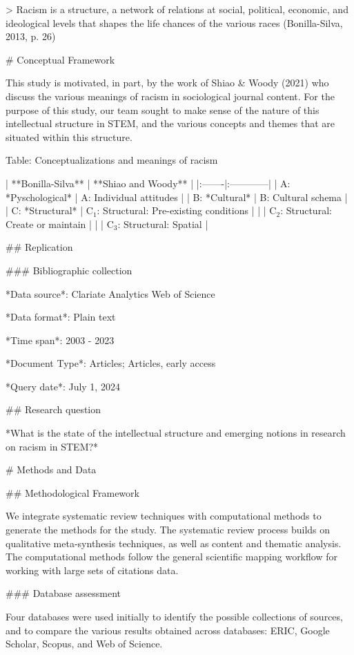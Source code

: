 {{> Racism is a structure, a network of relations at social, political, economic, and ideological levels that shapes the life chances of the various races (Bonilla-Silva, 2013, p. 26)

# Conceptual Framework

This study is motivated, in part, by the work of Shiao & Woody (2021) who discuss the various meanings of racism in sociological journal content.
For the purpose of this study, our team sought to make sense of the nature of this intellectual structure in STEM, and the various concepts and themes that are situated within this structure.


Table: Conceptualizations and meanings of racism

| **Bonilla-Silva** | **Shiao and Woody**                 | 
|:-------|:------------|
| A: *Pyschological*   | A: Individual attitudes                |
| B: *Cultural*        | B: Cultural schema                     |
| C: *Structural*      | C$_1$: Structural: Pre-existing conditions |
|                   | C$_2$: Structural: Create or maintain      |
|                   | C$_3$: Structural: Spatial                 |

## Replication

### Bibliographic collection

*Data source*: Clariate Analytics Web of Science

*Data format*: Plain text

*Time span*: 2003 - 2023

*Document Type*: Articles; Articles, early access

*Query date*: July 1, 2024

## Research question

*What is the state of the intellectual structure and emerging notions in research on racism in STEM?*

# Methods and Data

## Methodological Framework

We integrate systematic review techniques with computational methods to generate the methods for the study. The systematic review process builds on qualitative meta-synthesis techniques, as well as content and thematic analysis. The computational methods follow the general scientific mapping workflow for working with large sets of citations data.

### Database assessment

Four databases were used initially to identify the possible collections of sources, and to compare the various results obtained across databases: ERIC, Google Scholar, Scopus, and Web of Science.

}}
